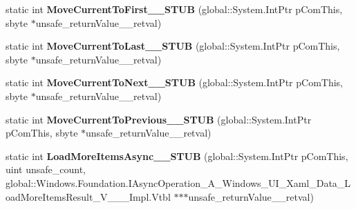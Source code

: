 \begin{DoxyCompactItemize}
static int {\bfseries Move\+Current\+To\+First\+\_\+\+\_\+\+S\+T\+UB} (global\+::\+System.\+Int\+Ptr p\+Com\+This, sbyte $\ast$unsafe\+\_\+return\+Value\+\_\+\+\_\+retval)
\item 
\mbox{\label{struct_windows_1_1_u_i_1_1_xaml_1_1_data_1_1_i_collection_view_____impl_1_1_vtbl_a52e8e47bad9fe0ee5b821399f8a80575}} 
static int {\bfseries Move\+Current\+To\+Last\+\_\+\+\_\+\+S\+T\+UB} (global\+::\+System.\+Int\+Ptr p\+Com\+This, sbyte $\ast$unsafe\+\_\+return\+Value\+\_\+\+\_\+retval)
\item 
\mbox{\label{struct_windows_1_1_u_i_1_1_xaml_1_1_data_1_1_i_collection_view_____impl_1_1_vtbl_ac0151651e7f0d4cc8fc00cf3ebd04d76}} 
static int {\bfseries Move\+Current\+To\+Next\+\_\+\+\_\+\+S\+T\+UB} (global\+::\+System.\+Int\+Ptr p\+Com\+This, sbyte $\ast$unsafe\+\_\+return\+Value\+\_\+\+\_\+retval)
\item 
\mbox{\label{struct_windows_1_1_u_i_1_1_xaml_1_1_data_1_1_i_collection_view_____impl_1_1_vtbl_a40d697dc01d277bfd4de18a4df9523fe}} 
static int {\bfseries Move\+Current\+To\+Previous\+\_\+\+\_\+\+S\+T\+UB} (global\+::\+System.\+Int\+Ptr p\+Com\+This, sbyte $\ast$unsafe\+\_\+return\+Value\+\_\+\+\_\+retval)
\item 
\mbox{\label{struct_windows_1_1_u_i_1_1_xaml_1_1_data_1_1_i_collection_view_____impl_1_1_vtbl_a911856c8fea3c3fe419b9d6c4c19ac81}} 
static int {\bfseries Load\+More\+Items\+Async\+\_\+\+\_\+\+S\+T\+UB} (global\+::\+System.\+Int\+Ptr p\+Com\+This, uint unsafe\+\_\+count, global\+::\+Windows.\+Foundation.\+I\+Async\+Operation\+\_\+\+A\+\_\+\+Windows\+\_\+\+U\+I\+\_\+\+Xaml\+\_\+\+Data\+\_\+\+Load\+More\+Items\+Result\+\_\+\+V\+\_\+\+\_\+\+\_\+\+Impl.\+Vtbl $\ast$$\ast$$\ast$unsafe\+\_\+return\+Value\+\_\+\+\_\+retval)
\item 
\mbox{\label{struct_windows_1_1_u_i_1_1_xaml_1_1_data_1_1_i_collection_view_____impl_1_1_vtbl_af4afa9645d45bff8ce19567b19f935e6}} 

\end{DoxyCompactItemize}
